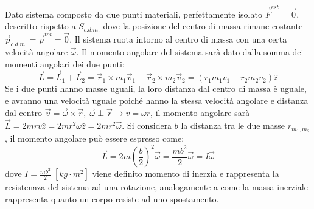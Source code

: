 \documentclass{article}
\numberwithin{equation}{subsection}
\begin{document}
Dato sistema composto da due punti materiali, perfettamente 
isolato $\vec{F}^{est}=\vec{0}$, descritto rispetto a $S_{c.d.m.}$ 
dove la posizione del centro 
di massa rimane costante $\vec{p}_{c.d.m.}=\vec{p}^{tot}=\vec{0}$. 
Il sistema ruota intorno al centro di massa con una certa 
velocità angolare $\vec{\omega}$. Il momento angolare del sistema 
sarà dato dalla somma dei momenti angolari dei due punti: 
\begin{equation*}
    \vec{L}=\vec{L}_1+\vec{L}_2=\vec{r}_1\times m_1\vec{v}_1+\vec{r}_2\times m_2\vec{v}_2=(r_1m_1v_1+r_2m_2v_2)\hat{z}
\end{equation*}
Se i due punti hanno masse uguali, la loro distanza dal centro di 
massa è uguale, e avranno una velocità uguale poiché hanno la stessa 
velocità angolare e distanza dal centro $\vec{v}=\vec{\omega}\times\vec{r},\:\vec{\omega}\perp\vec{r}\rightarrow v=\omega r$, 
il momento angolare sarà $\vec{L}=2mrv\hat{z}=2mr^2\omega\hat{z}=2mr^2\vec{\omega}$. 
Si considera $b$ la distanza tra le due masse $r_{m_1,m_2}$, 
il momento angolare può essere espresso come:
\begin{equation}
    \vec{L}=\displaystyle 2m\left(\frac{b}{2}\right)^2\vec{\omega}=\frac{mb^2}{2}\vec{\omega}=I\vec{\omega}
\end{equation}
dove $I=\displaystyle\frac{mb^2}{2}\;\left[kg\cdot m^2\right]$ viene definito momento di inerzia 
e rappresenta la resistenaza del sistema ad una rotazione, analogamente a come  
la massa inerziale rappresenta quanto un corpo resiste ad uno spostamento. 

\begin{center}\end{center}
\end{document}
